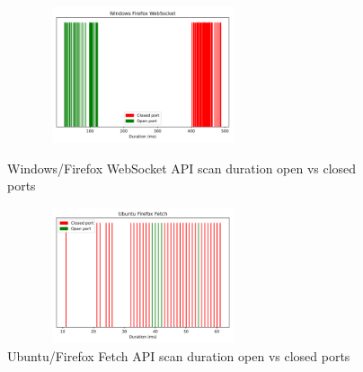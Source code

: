 \begin{figure}[ht]
\centering
\begin{minipage}{.45\textwidth}
  \centering
\includegraphics[width=8cm, height=4cm, keepaspectratio]{port_scanning_techniques/img/windows_Firefox_efficacy_websocket.png}
    \caption{Windows/Firefox WebSocket API scan duration open vs closed ports}
    \label{fig:appendix-win-firefox-websocket}
\end{minipage}
\hspace{0.5cm} %
\begin{minipage}{.45\textwidth}
\includegraphics[width=8cm, height=4cm, keepaspectratio]{port_scanning_techniques/img/ubuntu_Firefox_efficacy_fetch.png}
    \caption{Ubuntu/Firefox Fetch API scan duration open vs closed ports}
    \label{fig:ubuntu-firefox-fetch}
\end{minipage}
\end{figure}

